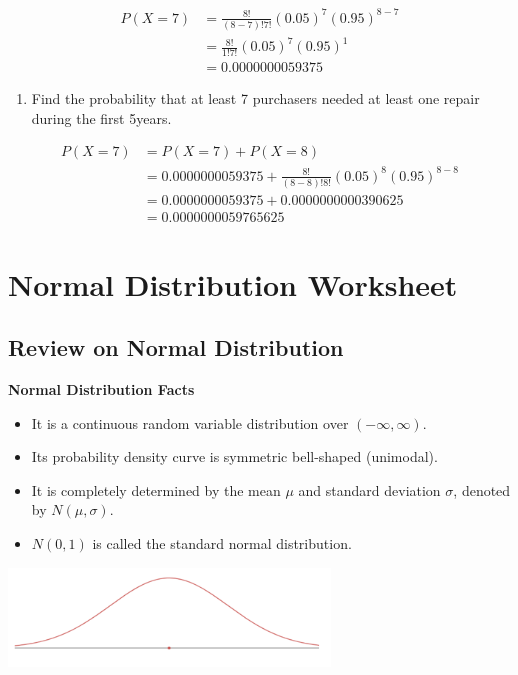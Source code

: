 \documentclass[
]{book}
\providecommand{\tightlist}{%
  \setlength{\itemsep}{0pt}\setlength{\parskip}{0pt}}
\begin{document}
\[
\begin{aligned}
P(X=7)&=\frac{8!}{(8-7)!7!}(0.05)^7(0.95)^{8-7} \\
&=\frac{8!}{1!7!}(0.05)^7(0.95)^1 \\
&=0.0000000059375
\end{aligned}
\]

\begin{enumerate}
\def\labelenumi{\arabic{enumi}.}
\setcounter{enumi}{1}
\tightlist
\item
  Find the probability that at least 7 purchasers needed at least one repair during the first 5years.
\end{enumerate}

\[
\begin{aligned}
P(X=7)&=P(X=7)+P(X=8)\\
&=0.0000000059375+\frac{8!}{(8-8)!8!}(0.05)^8(0.95)^{8-8} \\
&=0.0000000059375+0.0000000000390625 \\
&=0.0000000059765625
\end{aligned}
\]

\chapter{Normal Distribution Worksheet}\label{normal-distribution-worksheet}

\section{Review on Normal Distribution}\label{review-on-normal-distribution}

\textbf{Normal Distribution Facts}

\begin{itemize}
\tightlist
\item
  It is a continuous random variable distribution over \((-\infty, \infty)\).
\item
  Its probability density curve is symmetric bell-shaped (unimodal).
\item
  It is completely determined by the mean \(\mu\) and standard deviation \(\sigma\), denoted by \(N(\mu, \sigma)\).
\item
  \(N(0, 1)\) is called the standard normal distribution.
\end{itemize}

\includegraphics[width=3.36458in,height=\textheight]{images/img44.png}
\end{document}
